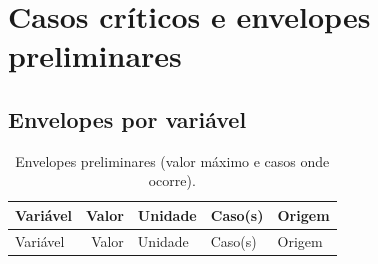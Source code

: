 \documentclass[11pt,a4paper]{article}
\numberwithin{equation}{section}
\numberwithin{table}{section}
\numberwithin{figure}{section}
\begin{document}
\section{Casos críticos e envelopes preliminares}\label{sec:envelopes}
\subsection{Envelopes por variável}
\begin{longtable}{L{6.4cm}rlL{2.2cm}L{3.2cm}}
\caption{Envelopes preliminares (valor máximo e casos onde ocorre).}\label{tab:env}\\\toprule
Variável & Valor & Unidade & Caso(s) & Origem\\\midrule\endfirsthead
\toprule Variável & Valor & Unidade & Caso(s) & Origem\\\midrule\endhead


\end{longtable}
\end{document}
